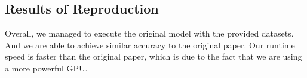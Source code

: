 \documentclass[11pt,a4paper]{article}
\begin{document}





\subsection{Results of Reproduction}



Overall, we managed to execute the original model with the provided datasets. And we are able to achieve similar accuracy to the original paper. Our runtime speed is faster than the original paper, which is due to the fact that we are using a more powerful GPU.
\end{document}

